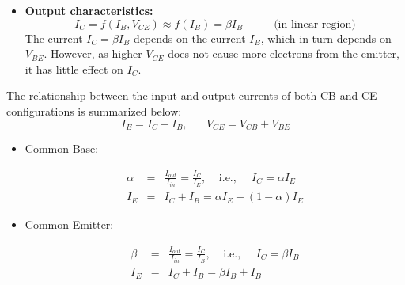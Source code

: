 \begin{itemize}
\begin{itemize}
  \item {\bf Output characteristics:} 
    \[
    I_C=f(I_B,V_{CE})\approx f(I_B)=\beta I_B\;\;\;\;\;\;\;\;\;\;\mbox{(in linear region)} 
    \]
    The current $I_C=\beta I_B$ depends on the current $I_B$, which in 
    turn depends on $V_{BE}$. However, as higher $V_{CE}$ does not cause
    more electrons from the emitter, it has little effect on $I_C$.

    
  \end{itemize}
\end{itemize}

The relationship between the input and output currents of both CB and CE 
configurations is summarized below:
\[
I_E=I_C+I_B,\;\;\;\;\;\;V_{CE}=V_{CB}+V_{BE}
\]

\begin{itemize}
\item Common Base:

  \begin{eqnarray}
    \alpha&=&\frac{I_{out}}{I_{in}}=\frac{I_C}{I_E},
    \;\;\;\;\mbox{i.e.,}\;\;\;\;\;I_C=\alpha I_E
    \nonumber\\
    I_E&=&I_C+I_B=\alpha I_E+(1-\alpha) I_E
    \nonumber
  \end{eqnarray}

\item Common Emitter:

  \begin{eqnarray}
    \beta&=&\frac{I_{out}}{I_{in}}=\frac{I_C}{I_B},
    \;\;\;\;\mbox{i.e.,}\;\;\;\;\;I_C=\beta I_B
    \nonumber\\
    I_E&=&I_C+I_B=\beta I_B + I_B
    \nonumber
  \end{eqnarray}

\end{itemize}


